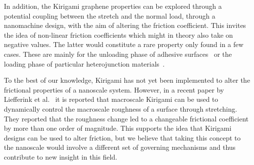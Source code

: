 In addition, the Kirigami graphene properties can be explored through a
potential coupling between the stretch and the normal load, through a
nanomachine design, with the aim of altering the friction coefficient. This
invites the idea of non-linear friction coefficients which might in theory also
take on negative values. The latter would constitute a rare property only found
in a few cases. These are mainly for the unloading phase of adhesive
surfaces~\cite{deng_adhesion-dependent_2012} or the loading phase of particular
heterojunction materials~\cite{Liu_2020, Mandelli_2019}.

To the best of our knowledge, Kirigami has not yet been implemented to alter the
frictional properties of a nanoscale system. However, in a recent paper by
Liefferink et al.~\cite{LIEFFERINK2021101475} it is reported that macroscale
Kirigami can be used to dynamically control the macroscale roughness of a
surface through stretching. They reported that the roughness change led to a
changeable frictional coefficient by more than one order of magnitude. This
supports the idea that Kirigami designs can be used to alter friction, but we
believe that taking this concept to the nanoscale would involve a different set
of governing mechanisms and thus contribute to new insight in this field.












